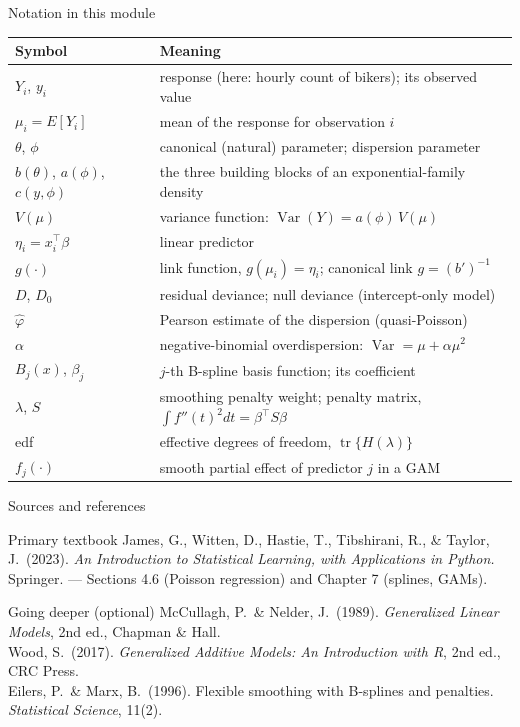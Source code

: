 \documentclass[aspectratio=169,11pt]{beamer}
\begin{document}
\begin{frame}{Notation in this module}
  \footnotesize
  \begin{center}
  \begin{tabular}{@{}ll@{}}
    \toprule
    \textbf{Symbol} & \textbf{Meaning} \\
    \midrule
    $Y_i$, $y_i$ & response (here: hourly count of bikers); its observed value \\
    $\mu_i = E[Y_i]$ & mean of the response for observation $i$ \\
    $\theta$, $\phi$ & canonical (natural) parameter; dispersion parameter \\
    $b(\theta)$, $a(\phi)$, $c(y,\phi)$ & the three building blocks of an exponential-family density \\
    $V(\mu)$ & variance function: $\operatorname{Var}(Y) = a(\phi)\,V(\mu)$ \\
    $\eta_i = x_i^{\top}\beta$ & linear predictor \\
    $g(\cdot)$ & link function, $g(\mu_i)=\eta_i$; canonical link $g = (b')^{-1}$ \\
    $D$, $D_0$ & residual deviance; null deviance (intercept-only model) \\
    $\hat\varphi$ & Pearson estimate of the dispersion (quasi-Poisson) \\
    $\alpha$ & negative-binomial overdispersion: $\operatorname{Var}=\mu+\alpha\mu^2$ \\
    $B_j(x)$, $\beta_j$ & $j$-th B-spline basis function; its coefficient \\
    $\lambda$, $S$ & smoothing penalty weight; penalty matrix, $\int f''(t)^2 dt=\beta^\top S\beta$ \\
    edf & effective degrees of freedom, $\operatorname{tr}\{H(\lambda)\}$ \\
    $f_j(\cdot)$ & smooth partial effect of predictor $j$ in a GAM \\
    \bottomrule
  \end{tabular}
  \end{center}
\end{frame}

\begin{frame}{Sources and references}
  \begin{block}{Primary textbook}
    James, G., Witten, D., Hastie, T., Tibshirani, R., \& Taylor, J.\ (2023).
    \emph{An Introduction to Statistical Learning, with Applications in
    Python.} Springer. --- Sections 4.6 (Poisson regression) and Chapter 7 (splines, GAMs).
  \end{block}
  \begin{block}{Going deeper (optional)}
    McCullagh, P.\ \& Nelder, J.\ (1989). \emph{Generalized Linear Models}, 2nd ed., Chapman \& Hall.\\
    Wood, S.\ (2017). \emph{Generalized Additive Models: An Introduction with R}, 2nd ed., CRC Press.\\
    Eilers, P.\ \& Marx, B.\ (1996). Flexible smoothing with B-splines and penalties. \emph{Statistical Science}, 11(2).
  \end{block}
\end{frame}
\end{document}
